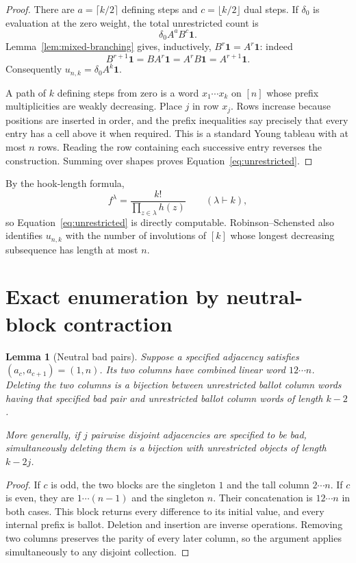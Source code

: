 \documentclass[11pt]{article}
\newtheorem{lemma}[theorem]{Lemma}
\theoremstyle{definition}
\begin{document}
\begin{proof}
There are $a=\lceil k/2\rceil$ defining steps and
$c=\lfloor k/2\rfloor$ dual steps.  If $\delta_0$ is evaluation at the zero
weight, the total unrestricted count is
\[
 \delta_0 A^aB^c\mathbf1.
\]
Lemma~\ref{lem:mixed-branching} gives, inductively,
$B^r\mathbf1=A^r\mathbf1$: indeed
\[
 B^{r+1}\mathbf1=BA^r\mathbf1=A^rB\mathbf1=A^{r+1}\mathbf1.
\]
Consequently $u_{n,k}=\delta_0A^k\mathbf1$.

A path of $k$ defining steps from zero is a word
$x_1\cdots x_k$ on $[n]$ whose prefix multiplicities are weakly decreasing.
Place $j$ in row $x_j$.  Rows increase because positions are inserted in
order, and the prefix inequalities say precisely that every entry has a cell
above it when required.  This is a standard Young tableau with at most $n$
rows.  Reading the row containing each successive entry reverses the
construction.  Summing over shapes proves Equation~\eqref{eq:unrestricted}.
\end{proof}

By the hook-length formula,
\begin{equation}\label{eq:hook}
 f^\lambda=\frac{k!}{\prod_{z\in\lambda}h(z)}
 \qquad(\lambda\vdash k),
\end{equation}
so Equation~\eqref{eq:unrestricted} is directly computable.
Robinson--Schensted also identifies $u_{n,k}$ with the number of involutions
of $[k]$ whose longest decreasing subsequence has length at most $n$.

\section{Exact enumeration by neutral-block contraction}

\begin{lemma}[Neutral bad pairs]\label{lem:neutral-pairs}
Suppose a specified adjacency satisfies $(a_c,a_{c+1})=(1,n)$.  Its two
columns have combined linear word $12\cdots n$.  Deleting the two columns is
a bijection between unrestricted ballot column words having that specified
bad pair and unrestricted ballot column words of length $k-2$.

More generally, if $j$ pairwise disjoint adjacencies are specified to be bad,
simultaneously deleting them is a bijection with unrestricted objects of
length $k-2j$.
\end{lemma}

\begin{proof}
If $c$ is odd, the two blocks are the singleton $1$ and the tall column
$2\cdots n$.  If $c$ is even, they are $1\cdots(n-1)$ and the singleton $n$.
Their concatenation is $12\cdots n$ in both cases.  This block returns every
difference to its initial value, and every internal prefix is ballot.
Deletion and insertion are inverse operations.  Removing two columns
preserves the parity of every later column, so the argument applies
simultaneously to any disjoint collection.
\end{proof}
\end{document}
